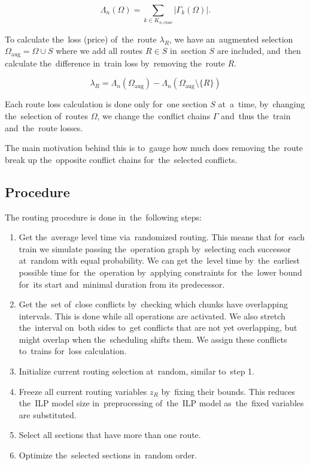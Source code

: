 \begin{equation}
  \Lambda_n(\Omega) = \sum_{k \in K_{n,\mathrm{close}}} |\Gamma_k(\Omega)|.
\end{equation}

To calculate the~loss (price) of~the~route $\lambda_R$, we have an~augmented selection $\Omega_\mathrm{aug} = \Omega \cup S$ where we add all routes $R \in S$ in~section $S$ are included, and~then calculate the~difference in~train loss by~removing the~route $R$.

\begin{equation}
  \lambda_R = \Lambda_n(\Omega_\mathrm{aug}) - \Lambda_n(\Omega_\mathrm{aug} \setminus \{R\})
\end{equation}

Each route loss calculation is done only for~one section $S$ at~a~time, by~changing the~selection of~routes $\Omega$, we change the~conflict chains $\Gamma$ and~thus the~train and~the~route losses.

The main motivation behind this is to~gauge how much does removing the~route break up the~opposite conflict chains for~the~selected conflicts.

\subsection{Procedure}
The routing procedure is done in~the~following steps:
\begin{enumerate}
  \item Get the~average level time via~randomized routing. This means that for~each train we simulate passing the~operation graph by~selecting each successor at~random with equal probability. We can get the~level time by~the~earliest possible time for~the~operation by~applying constraints for~the~lower bound for~its start and~minimal duration from its predecessor.
  \item Get the~set of~close conflicts by~checking which chunks have overlapping intervals. This is done while all operations are activated. We also stretch the~interval on~both sides to~get conflicts that are not yet overlapping, but might overlap when the~scheduling shifts them. We assign these conflicts to~trains for~loss calculation.
  \item Initialize current routing selection at~random, similar to~step 1.
  \item Freeze all current routing variables $z_R$ by~fixing their bounds. This reduces the~ILP model size in~preprocessing of~the~ILP model as~the~fixed variables are substituted.
  \item Select all sections that have more than one route.
  \item Optimize the~selected sections in~random order.
\end{enumerate}


